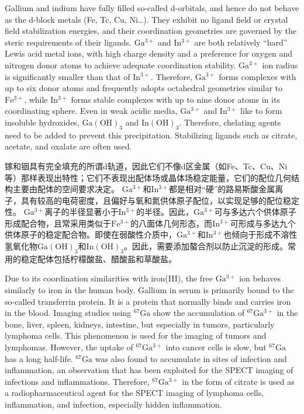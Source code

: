 \documentclass[dvipsnames, svgnames,a4paper,11pt]{article}
\begin{document}
Gallium and indium have fully filled so-called d-orbitals, and hence do not behave as the d-block metals (Fe, Tc, Cu, Ni…). They exhibit no ligand field or crystal field stabilization energies, and their coordination geometries are governed by the steric requirements of their ligands. \(\mathrm{Ga^{3+}}\) and \(\mathrm{In^{3+}}\) are both relatively “hard” Lewis acid metal ions, with high charge density and a preference for oxygen and nitrogen donor atoms to achieve adequate coordination stability. \(\mathrm{Ga^{3+}}\) ion radius is significantly smaller than that of \(\mathrm{In^{3+}}\). Therefore, \(\mathrm{Ga^{3+}}\) forms complexes with up to six donor atoms and frequently adopts octahedral geometries similar to \(\mathrm{Fe^{3+}}\), while \(\mathrm{In^{3+}}\) forms stable complexes with up to nine donor atoms in its coordinating sphere. Even in weak acidic media, \(\mathrm{Ga^{3+}}\) and \(\mathrm{In^{3+}}\) like to form insoluble hydroxides, \(\mathrm{Ga(OH)_{3}}\) and \(\mathrm{In(OH)_{3}}\). Therefore, chelating agents need to be added to prevent this precipitation. Stabilizing ligands such as citrate, acetate, and oxalate are often used.

镓和铟具有完全填充的所谓d轨道，因此它们不像d区金属（如Fe、Tc、Cu、Ni等）那样表现出特性；它们不表现出配体场或晶体场稳定能量，它们的配位几何结构主要由配体的空间要求决定。 \(\mathrm{Ga^{3+}}\)和\(\mathrm{In^{3+}}\)都是相对“硬”的路易斯酸金属离子，具有较高的电荷密度，且偏好与氧和氮供体原子配位，以实现足够的配位稳定性。 \(\mathrm{Ga^{3+}}\)离子的半径显著小于\(\mathrm{In^{3+}}\)的半径。因此，\(\mathrm{Ga^{3+}}\)可与多达六个供体原子形成配合物，且常采用类似于\(\mathrm{Fe^{3+}}\)的八面体几何形态，而\(\mathrm{In^{3+}}\)可形成与多达九个供体原子的稳定配合物。即使在弱酸性介质中，\(\mathrm{Ga^{3+}}\)和\(\mathrm{In^{3+}}\)也倾向于形成不溶性氢氧化物\(\mathrm{Ga(OH)_3}\)和\(\mathrm{In(OH)_3}\)。因此，需要添加螯合剂以防止沉淀的形成。常用的稳定配体包括柠檬酸盐、醋酸盐和草酸盐。

Due to its coordination similarities with iron(III), the free \(\mathrm{Ga^{3+}}\) ion behaves similarly to iron in the human body. Gallium in serum is primarily bound to the so-called transferrin protein. It is a protein that normally binds and carries iron in the blood. Imaging studies using \(\mathrm{^{67}Ga}\) show the accumulation of \(\mathrm{^{67}Ga^{3+}}\) in the bone, liver, spleen, kidneys, intestine, but especially in tumors, particularly lymphoma cells. This phenomenon is used for the imaging of tumors and lymphomas. However, the uptake of \(\mathrm{^{67}Ga^{3+}}\) into cancer cells is slow, but \(\mathrm{^{67}Ga}\) has a long half-life. \(\mathrm{^{67}Ga}\) was also found to accumulate in sites of infection and inflammation, an observation that has been exploited for the SPECT imaging of infections and inflammations. Therefore, \(\mathrm{^{67}Ga^{3+}}\) in the form of citrate is used as a radiopharmaceutical agent for the SPECT imaging of lymphoma cells, inflammation, and infection, especially hidden inflammation.
\end{document}
